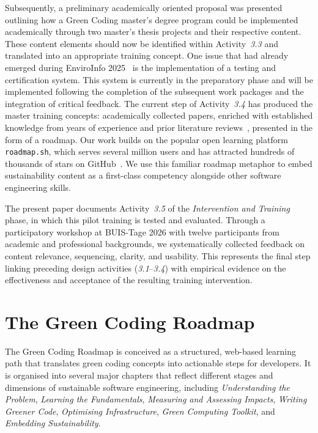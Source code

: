 \documentclass[english]{lni}
\begin{document}
Subsequently, a preliminary academically oriented proposal was presented outlining how a Green Coding master's degree program could be implemented academically through two master's thesis projects and their respective content. These content elements should now be identified within Activity~\emph{3.3} and translated into an appropriate training concept.
One issue that had already emerged during EnviroInfo 2025~\cite{enviroInfo25} is the implementation of a testing and certification system. This system is currently in the preparatory phase and will be implemented following the completion of the subsequent work packages and the integration of critical feedback.
The current step of Activity~\emph{3.4} has produced the master training concepts: academically collected papers, enriched with established knowledge from years of experience and prior literature reviews~\cite{junger23_litrep}, presented in the form of a roadmap.
Our work builds on the popular open learning platform \texttt{roadmap.sh}, which serves several million users and has attracted hundreds of thousands of stars on GitHub~\cite{roadmap}. We use this familiar roadmap metaphor to embed sustainability content as a first-class competency alongside other software engineering skills.

The present paper documents Activity~\emph{3.5} of the \emph{Intervention and Training} phase, in which this pilot training is tested and evaluated. Through a participatory workshop at BUIS-Tage 2026 with twelve participants from academic and professional backgrounds, we systematically collected feedback on content relevance, sequencing, clarity, and usability. This represents the final step linking preceding design activities (\emph{3.1}--\emph{3.4}) with empirical evidence on the effectiveness and acceptance of the resulting training intervention.


\section{The Green Coding Roadmap}

The Green Coding Roadmap is conceived as a structured, web-based learning path that translates green coding concepts into actionable steps for developers. It is organised into several major chapters that reflect different stages and dimensions of sustainable software engineering, including \emph{Understanding the Problem}, \emph{Learning the Fundamentals}, \emph{Measuring and Assessing Impacts}, \emph{Writing Greener Code}, \emph{Optimising Infrastructure}, \emph{Green Computing Toolkit}, and \emph{Embedding Sustainability}.
\end{document}
